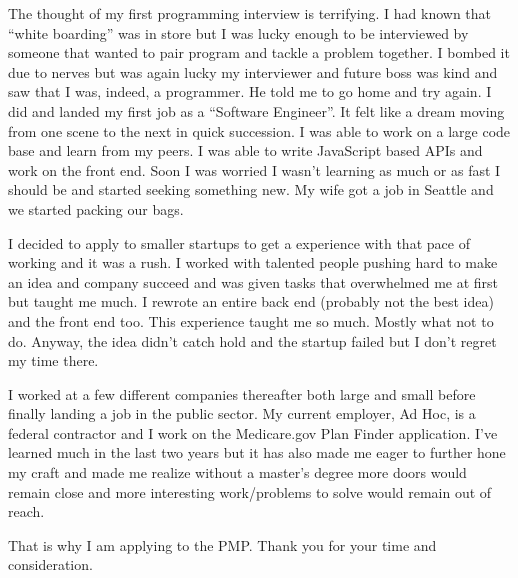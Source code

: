 \documentclass{article}
\begin{document}
The thought of my first programming interview is terrifying. I had known that ``white boarding'' was in store but I was lucky enough to be interviewed by someone that wanted to pair program and tackle a problem together. I bombed it due to nerves but was again lucky my interviewer and future boss was kind and saw that I was, indeed, a programmer. He told me to go home and try again. I did and landed my first job as a ``Software Engineer''. It felt like a dream moving from one scene to the next in quick succession. I was able to work on a large code base and learn from my peers. I was able to write JavaScript based APIs and work on the front end. Soon I was worried I wasn't learning as much or as fast I should be and started seeking something new. My wife got a job in Seattle and we started packing our bags. 

I decided to apply to smaller startups to get a experience with that pace of working and it was a rush. I worked with talented people pushing hard to make an idea and company succeed and was given tasks that overwhelmed me at first but taught me much. I rewrote an entire back end (probably not the best idea) and the front end too. This experience taught me so much. Mostly what not to do. Anyway, the idea didn't catch hold and the startup failed but I don't regret my time there.

I worked at a few different companies thereafter both large and small before finally landing a job in the public sector. My current employer, Ad Hoc, is a federal contractor and I work on the Medicare.gov Plan Finder application. I've learned much in the last two years but it has also made me eager to further hone my craft and made me realize without a master's degree more doors would remain close and more interesting work/problems to solve would remain out of reach.

That is why I am applying to the PMP. Thank you for your time and consideration.
\end{document}
